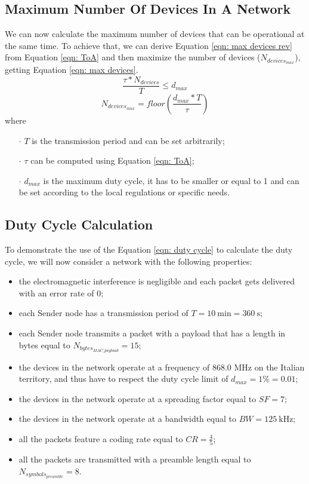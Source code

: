 \subsection{Maximum Number Of Devices In A Network}
We can now calculate the maximum number of devices that can be operational at the same time. To achieve that, we can
derive Equation \ref{eqn: max devices rev} from Equation \ref{eqn: ToA} and then maximize the number of devices
($\mathit{N_{devices_{max}}}$), getting Equation \ref{eqn: max devices}.
\begin{equation}
    \label{eqn: max devices rev}
    \frac{\tau * \mathit{N_{devices}}}{T} \leq \mathit{d_{max}}
\end{equation}
\begin{equation}
    \label{eqn: max devices}
    N_{devices_{max}} = \textit{floor} \left( \frac{\mathit{d_{max}} * T}{\tau} \right)
\end{equation}
where
\begin{itemize}[noitemsep,nolistsep]
    \item[\boldmath$\cdot$] $T$ is the transmission period and can be set arbitrarily;
    \item[\boldmath$\cdot$] $\tau$ can be computed using Equation \ref{eqn: ToA};
    \item[\boldmath$\cdot$] $\mathit{d_{max}}$ is the maximum duty cycle, it has to be smaller or equal to 1 and can be
        set according to the local regulations or specific needs.
\end{itemize}

\subsection{Duty Cycle Calculation}
To demonstrate the use of the Equation \ref{eqn: duty cycle} to calculate the duty cycle, we will now consider a network
with the following properties:
\begin{itemize}
    \item the electromagnetic interference is negligible and each packet gets delivered with an error rate of 0;
    \item each Sender node has a transmission period of $T = 10\ \mathrm{ min} = 360\ \mathrm{s}$;
    \item each Sender node transmits a packet with a payload that has a length in bytes equal to
        $\mathit{N_{bytes_{MAC\_payload}}} = 15$;
    \item the devices in the network operate at a frequency of 868.0 MHz on the Italian territory, and thus have to
        respect the duty cycle limit of $\mathit{d_{max}} = 1\% = 0.01$;
    \item the devices in the network operate at a spreading factor equal to $\mathit{SF} = 7$;
    \item the devices in the network operate at a bandwidth equal to $\mathit{BW} = 125\ \mathrm{kHz}$;
    \item all the packets feature a coding rate equal to $\mathit{CR} = \frac{4}{5}$;
    \item all the packets are transmitted with a preamble length equal to $\mathit{N_{symbols_{preamble}}} = 8$.
\end{itemize}

